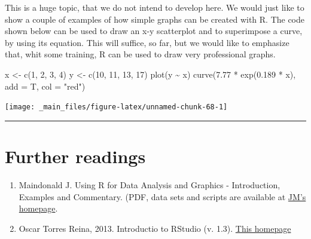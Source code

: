 \documentclass[a4paper,12pt,oneside]{book}
\providecommand{\tightlist}{%
  \setlength{\itemsep}{0pt}\setlength{\parskip}{0pt}}
\newenvironment{Shaded}{\begin{snugshade}}{\end{snugshade}}
\newcommand{\DecValTok}[1]{#1}
\newcommand{\FloatTok}[1]{#1}
\newcommand{\SpecialCharTok}[1]{#1}
\newcommand{\StringTok}[1]{#1}
\newcommand{\OtherTok}[1]{#1}
\newcommand{\FunctionTok}[1]{#1}
\newcommand{\AttributeTok}[1]{#1}
\newcommand{\NormalTok}[1]{#1}
\begin{document}
This is a huge topic, that we do not intend to develop here. We would just like to show a couple of examples of how simple graphs can be created with R. The code shown below can be used to draw an x-y scatterplot and to superimpose a curve, by using its equation. This will suffice, so far, but we would like to emphasize that, whit some training, R can be used to draw very professional graphs.

\begin{Shaded}
\begin{Highlighting}[]
\NormalTok{x  }\OtherTok{\textless{}{-}}  \FunctionTok{c}\NormalTok{(}\DecValTok{1}\NormalTok{, }\DecValTok{2}\NormalTok{, }\DecValTok{3}\NormalTok{, }\DecValTok{4}\NormalTok{)}
\NormalTok{y  }\OtherTok{\textless{}{-}}  \FunctionTok{c}\NormalTok{(}\DecValTok{10}\NormalTok{, }\DecValTok{11}\NormalTok{, }\DecValTok{13}\NormalTok{, }\DecValTok{17}\NormalTok{)}
\FunctionTok{plot}\NormalTok{(y }\SpecialCharTok{\textasciitilde{}}\NormalTok{ x)}
\FunctionTok{curve}\NormalTok{(}\FloatTok{7.77} \SpecialCharTok{*} \FunctionTok{exp}\NormalTok{(}\FloatTok{0.189} \SpecialCharTok{*}\NormalTok{ x), }\AttributeTok{add =}\NormalTok{ T, }\AttributeTok{col =} \StringTok{"red"}\NormalTok{)}
\end{Highlighting}
\end{Shaded}

\texttt{[image: \_main\_files/figure-latex/unnamed-chunk-68-1]}

\begin{center}\rule{0.5\linewidth}{0.5pt}\end{center}

\hypertarget{further-readings-4}{%
\section{Further readings}\label{further-readings-4}}

\begin{enumerate}
\def\labelenumi{\arabic{enumi}.}
\tightlist
\item
  Maindonald J. Using R for Data Analysis and Graphics - Introduction, Examples and Commentary. (PDF, data sets and scripts are available at \href{https://cran.r-project.org/doc/contrib/usingR.pdff}{JM's homepage}.
\item
  Oscar Torres Reina, 2013. Introductio to RStudio (v. 1.3). \href{https://dss.princeton.edu/training/RStudio101.pdf}{This homepage}
\end{enumerate}
\end{document}
